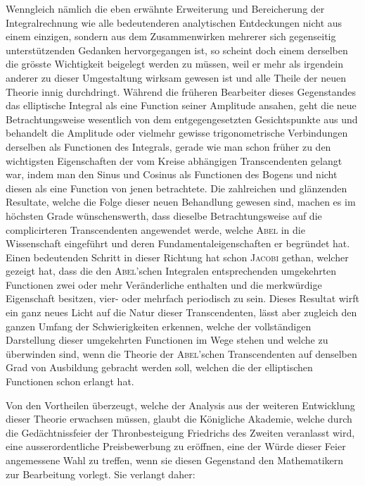 \documentclass[11pt]{article}
\newcommand{\scn}[1]{\textsc{#1}}
\begin{document}
Wenngleich nämlich die eben erwähnte Erweiterung und Bereicherung der Integralrechnung wie alle bedeutenderen analytischen Entdeckungen nicht aus einem einzigen, sondern aus dem Zusammenwirken mehrerer sich gegenseitig unterstützenden Gedanken hervorgegangen ist, so scheint doch einem derselben die grösste Wichtigkeit beigelegt werden zu müssen, weil er mehr als irgendein anderer zu dieser Umgestaltung wirksam gewesen ist und alle Theile der neuen Theorie innig durchdringt. Während die früheren Bearbeiter dieses Gegenstandes das elliptische Integral als eine Function seiner Amplitude ansahen, geht die neue Betrachtungsweise wesentlich von dem entgegengesetzten Gesichtspunkte aus und behandelt die Amplitude oder vielmehr gewisse trigonometrische Verbindungen derselben als Functionen des Integrals, gerade wie man schon früher zu den wichtigsten Eigenschaften der vom Kreise abhängigen Transcendenten gelangt war, indem man den Sinus und Cosinus als Functionen des Bogens und nicht diesen als eine Function von jenen betrachtete. Die zahlreichen und glänzenden Resultate, welche die Folge dieser neuen Behandlung gewesen sind, machen es im höchsten Grade wünschenswerth, dass dieselbe Betrachtungsweise auf die complicirteren Transcendenten angewendet werde, welche \scn{Abel} in die Wissenschaft eingeführt und deren Fundamentaleigenschaften er begründet hat. Einen bedeutenden Schritt in dieser Richtung hat schon \scn{Jacobi} gethan, welcher gezeigt hat, dass die den \scn{Abel}'schen Integralen entsprechenden umgekehrten Functionen zwei oder mehr Veränderliche enthalten und die merkwürdige Eigenschaft besitzen, vier- oder mehrfach periodisch zu sein. Dieses Resultat wirft ein ganz neues Licht auf die Natur dieser Transcendenten, lässt aber zugleich den ganzen Umfang der Schwierigkeiten erkennen, welche der vollständigen Darstellung dieser umgekehrten Functionen im Wege stehen und welche zu überwinden sind, wenn die Theorie der \scn{Abel}'schen Transcendenten auf denselben Grad von Ausbildung gebracht werden soll, welchen die der elliptischen Functionen schon erlangt hat.

Von den Vortheilen überzeugt, welche der Analysis aus der weiteren Entwicklung dieser Theorie erwachsen müssen, glaubt die Königliche Akademie, welche durch die Gedächtnissfeier der Thronbesteigung Friedrichs des Zweiten veranlasst wird, eine ausserordentliche Preisbewerbung zu eröffnen, eine der Würde dieser Feier angemessene Wahl zu treffen, wenn sie diesen Gegenstand den Mathematikern zur Bearbeitung vorlegt. Sie verlangt daher:
\end{document}
